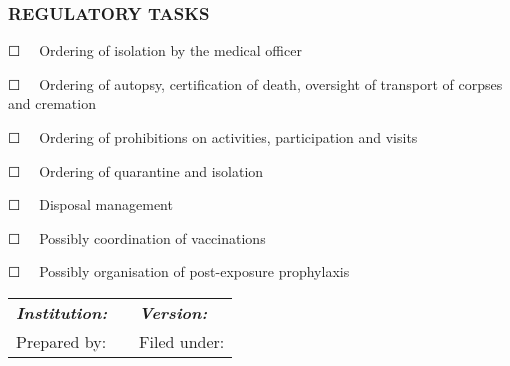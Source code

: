 \documentclass{article}
\begin{document}
\subsubsection{REGULATORY TASKS}\label{H7293213}



☐   Ordering of isolation by the medical officer


☐   Ordering of autopsy, certification of death, oversight of transport of corpses and cremation


☐   Ordering of prohibitions on activities, participation and visits


☐   Ordering of quarantine and isolation


☐   Disposal management


☐   Possibly coordination of vaccinations


☐   Possibly organisation of post-exposure prophylaxis


\begin{tabu} to \textwidth { |X|X|X| }
\hline



\emph{\textbf{Institution:}} &  & \emph{\textbf{Version:}}
 \\


Prepared by: &  &  Filed under:
 \\
\hline

\end{tabu}

 


 


 
\end{document}
